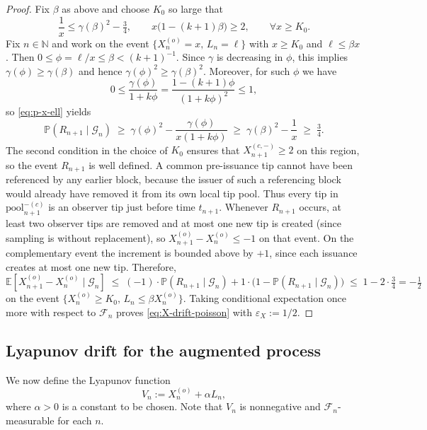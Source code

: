 \documentclass[a4paper,12pt,oneside,reqno]{amsart}
\newcommand{\N}{{\mathbb N}}
\renewcommand{\P}{{\mathbb P}}
\newcommand{\E}{{\mathbb E}}
\newcommand{\F}{{\mathcal F}}
\newcommand{\1}{{\mathbf 1}}
\newcommand{\pool}{\mathrm{pool}}
\begin{document}
\begin{proof}
Fix $\beta$ as above and choose $K_0$ so large that
\[
   \frac{1}{x} \le \gamma(\beta)^2 - \tfrac34,
   \qquad
   x\bigl(1-(k+1)\beta\bigr)\ge 2,
   \qquad \forall x\ge K_0.
\]
Fix $n\in\N$ and work on the event $\{X_n^{(o)}=x,\,L_n=\ell\}$ with $x\ge K_0$ and $\ell\le\beta x$. Then $0\le\phi=\ell/x\le\beta<(k+1)^{-1}$. Since $\gamma$ is decreasing in $\phi$, this implies $\gamma(\phi)\ge\gamma(\beta)$ and hence $\gamma(\phi)^2\ge\gamma(\beta)^2$. Moreover, for such $\phi$ we have
\[
   0\le \frac{\gamma(\phi)}{1+k\phi} = \frac{1-(k+1)\phi}{(1+k\phi)^2} \le 1,
\]
so \eqref{eq:p-x-ell} yields
\[
   \P(R_{n+1}\mid \mathcal{G}_n)
   \;\ge\; \gamma(\phi)^2 - \frac{\gamma(\phi)}{x(1+k\phi)}
   \;\ge\; \gamma(\beta)^2 - \frac{1}{x}
   \;\ge\; \tfrac34.
\]
The second condition in the choice of $K_0$ ensures that $X_{n+1}^{(c,-)}\ge 2$ on this region, so the event $R_{n+1}$ is well defined. A common pre-issuance tip cannot have been referenced by any earlier block, because the issuer of such a referencing block would already have removed it from its own local tip pool. Thus every tip in $\pool_{n+1}^{-(c)}$ is an observer tip just before time $t_{n+1}$. Whenever $R_{n+1}$ occurs, at least two observer tips are removed and at most one new tip is created (since sampling is without replacement), so $X_{n+1}^{(o)}-X_n^{(o)}\le -1$ on that event. On the complementary event the increment is bounded above by $+1$, since each issuance creates at most one new tip. Therefore,
\[
   \E[X_{n+1}^{(o)}-X_n^{(o)}\mid \mathcal{G}_n]
   \;\le\; (-1)\cdot \P(R_{n+1}\mid \mathcal{G}_n) + 1\cdot\bigl(1-\P(R_{n+1}\mid \mathcal{G}_n)\bigr)
   \;\le\; 1-2\cdot\tfrac34 = -\tfrac12
\]
on the event $\{X_n^{(o)}\ge K_0,\,L_n\le\beta X_n^{(o)}\}$. Taking conditional expectation once more with respect to $\F_n$ proves \eqref{eq:X-drift-poisson} with $\varepsilon_X:=1/2$.
\end{proof}

\subsection{Lyapunov drift for the augmented process}

We now define the Lyapunov function
\[
   V_n := X_n^{(o)} + \alpha L_n,
\]
where $\alpha>0$ is a constant to be chosen. Note that $V_n$ is nonnegative and $\F_n$-measurable for each $n$.
\end{document}
